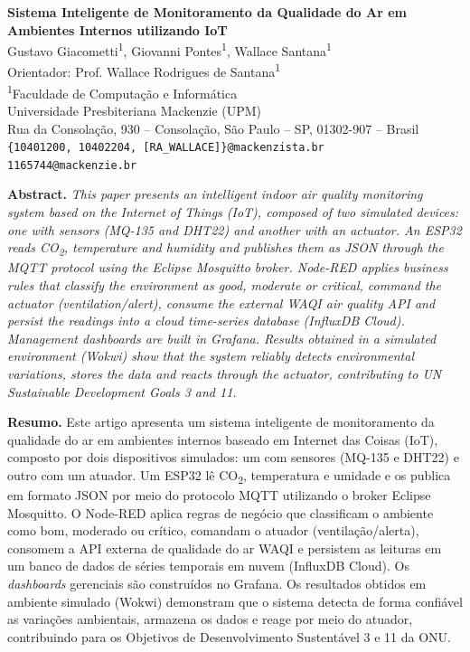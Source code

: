 \documentclass[12pt,a4paper]{article}
\begin{document}
\begin{center}
{\large \textbf{Sistema Inteligente de Monitoramento da Qualidade do Ar em \\ Ambientes Internos utilizando IoT}}\\[0.6cm]
Gustavo Giacometti\textsuperscript{1}, Giovanni Pontes\textsuperscript{1}, Wallace Santana\textsuperscript{1}\\[0.2cm]
Orientador: Prof. Wallace Rodrigues de Santana\textsuperscript{1}\\[0.3cm]
\textsuperscript{1}Faculdade de Computação e Informática\\
Universidade Presbiteriana Mackenzie (UPM)\\
Rua da Consolação, 930 -- Consolação, São Paulo -- SP, 01302-907 -- Brasil\\[0.2cm]
\small\texttt{\{10401200, 10402204, [RA\_WALLACE]\}@mackenzista.br}\\
\small\texttt{1165744@mackenzie.br}
\end{center}
\vspace{0.4cm}

\noindent\textbf{Abstract.} \textit{This paper presents an intelligent indoor air quality monitoring
system based on the Internet of Things (IoT), composed of two simulated devices: one with sensors
(MQ-135 and DHT22) and another with an actuator. An ESP32 reads CO\textsubscript{2}, temperature and
humidity and publishes them as JSON through the MQTT protocol using the Eclipse Mosquitto broker.
Node-RED applies business rules that classify the environment as good, moderate or critical, command
the actuator (ventilation/alert), consume the external WAQI air quality API and persist the readings
into a cloud time-series database (InfluxDB Cloud). Management dashboards are built in Grafana. Results
obtained in a simulated environment (Wokwi) show that the system reliably detects environmental
variations, stores the data and reacts through the actuator, contributing to UN Sustainable
Development Goals 3 and 11.}

\vspace{0.3cm}
\noindent\textbf{Resumo.} Este artigo apresenta um sistema inteligente de monitoramento da qualidade do
ar em ambientes internos baseado em Internet das Coisas (IoT), composto por dois dispositivos simulados:
um com sensores (MQ-135 e DHT22) e outro com um atuador. Um ESP32 lê CO\textsubscript{2}, temperatura e
umidade e os publica em formato JSON por meio do protocolo MQTT utilizando o broker Eclipse Mosquitto. O
Node-RED aplica regras de negócio que classificam o ambiente como bom, moderado ou crítico, comandam o
atuador (ventilação/alerta), consomem a API externa de qualidade do ar WAQI e persistem as leituras em um
banco de dados de séries temporais em nuvem (InfluxDB Cloud). Os \textit{dashboards} gerenciais são
construídos no Grafana. Os resultados obtidos em ambiente simulado (Wokwi) demonstram que o sistema
detecta de forma confiável as variações ambientais, armazena os dados e reage por meio do atuador,
contribuindo para os Objetivos de Desenvolvimento Sustentável 3 e 11 da ONU.
\end{document}
